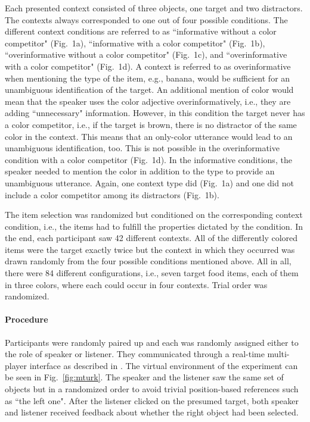 \documentclass[10pt,letterpaper]{article}
\newcommand{\figref}[1]{Fig.~\ref{#1}}
\begin{document}
Each presented context consisted of three objects, one target and two distractors. The contexts always corresponded to one out of four possible conditions. The different context conditions are referred to as ``informative without a color competitor" (Fig.~1a), ``informative with a color competitor" (Fig.~1b), ``overinformative without a color competitor" (Fig.~1c), and ``overinformative with a color competitor" (Fig.~1d). A context is referred to as overinformative when mentioning the type of the item, e.g., banana, would be sufficient for an unambiguous identification of the target. An additional mention of color would mean that the speaker uses the color adjective overinformatively, i.e., they are adding ``unnecessary" information. However, in this condition the target never has a color competitor, i.e., if the target is brown, there is no distractor of the same color in the context. This means that an only-color utterance would lead to an unambiguous identification, too. This is not possible in the overinformative condition with a color competitor (Fig.~1d). In the informative conditions, the speaker needed to mention the color in addition to the type to provide an unambiguous utterance. Again, one context type did (Fig.~1a) and one did not include a color competitor among its distractors (Fig.~1b).

The item selection was randomized but conditioned on the corresponding context condition, i.e., the items had to fulfill the properties dictated by the condition. In the end, each participant saw 42 different contexts. All of the differently colored items were the target exactly twice but the context in which they occurred was drawn randomly from the four possible conditions mentioned above. All in all, there were 84 different configurations, i.e., seven target food items, each of them in three colors, where each could occur in four contexts. Trial order was randomized.


\paragraph{Procedure}

Participants were randomly paired up and each was randomly assigned either to the role of  speaker or listener. They communicated through a real-time multi-player interface as described in . The virtual environment of the experiment can be seen in \figref{fig:mturk}. The speaker and the listener saw the same set of objects but in a randomized order to avoid trivial position-based references such as ``the left one". After the listener clicked on the presumed target, both speaker and listener received feedback about whether the right object had been selected.
\end{document}
